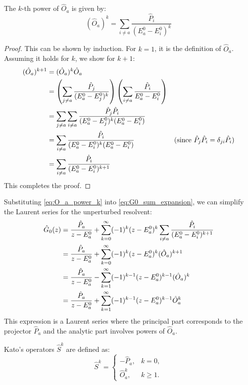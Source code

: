 \begin{lemma}
  The $k$-th power of $\hat O_a$ is given by:
  \begin{equation} \label{eq:O_a_power_k}
    (\hat O_a)^k = \sum_{i \ne a} \frac{\hat P_i}{(E_a^0 - E_i^0)^k}
  \end{equation}
\end{lemma}
\begin{proof}
  This can be shown by induction. For $k=1$, it is the definition
  of $\hat O_a$. Assuming it holds for $k$, we show for $k+1$:
  \begin{align} \label{eq:O_a_power_k_proof}
    (\hat O_a)^{k+1} &= (\hat O_a)^k \hat O_a \\
    &= \left( \sum_{j \ne a} \frac{\hat P_j}{(E_a^0 - E_j^0)^k}
    \right) \left( \sum_{i \ne a} \frac{\hat P_i}{E_a^0 - E_i^0}
    \right) \notag \\
    &= \sum_{j \ne a} \sum_{i \ne a} \frac{\hat P_j \hat
    P_i}{(E_a^0 - E_j^0)^k (E_a^0 - E_i^0)} \notag \\
    &= \sum_{i \ne a} \frac{\hat P_i}{(E_a^0 - E_i^0)^k (E_a^0 -
    E_i^0)} \quad &\text{(since } \hat P_j \hat P_i =
    \delta_{ji} \hat P_i \text{)} \notag \\
    &= \sum_{i \ne a} \frac{\hat P_i}{(E_a^0 - E_i^0)^{k+1}} \notag
  \end{align}
  This completes the proof.
\end{proof}

Substituting \eqref{eq:O_a_power_k} into \eqref{eq:G0_sum_expansion},
we can simplify the Laurent series for the unperturbed resolvent:
\begin{align} \label{eq:G0_laurent_simplified}
  \hat G_0(z) &= \frac{\hat P_a}{z - E_a^0} + \sum_{k=0}^\infty
  (-1)^k (z-E_a^0)^k \sum_{i\neq a}\frac{\hat P_i}{(E_a^0-E_i^0)^{k+1}} \\
  &= \frac{\hat P_a}{z-E_a^0} + \sum_{k=0}^\infty (-1)^k
  (z-E_a^0)^k (\hat O_a)^{k+1} \notag \\
  &= \frac{\hat P_a}{z-E_a^0} - \sum_{k=1}^\infty (-1)^{k-1}
  (z-E_a^0)^{k-1} (\hat O_a)^{k} \notag \\
  &= \frac{\hat P_a}{z-E_a^0} + \sum_{k=1}^\infty (-1)^{k-1}
  (z-E_a^0)^{k-1} \hat O_a^k \notag
\end{align}
This expression is a Laurent series where the principal part
corresponds to the projector $\hat P_a$ and the analytic part
involves powers of $\hat O_a$.

\begin{definition}
  Kato’s operators $\hat S^k$ are defined as:
  \begin{equation} \label{eq:kato_operators_S_k}
    \hat S^k=
    \begin{cases}
      -\hat P_a,& k=0,\\[2pt]
      \hat O_a^k,& k\ge 1.
    \end{cases}
  \end{equation}
\end{definition}

